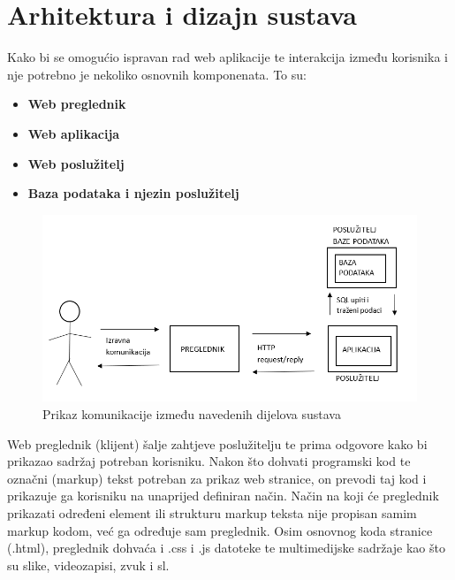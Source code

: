 \chapter{Arhitektura i dizajn sustava}

Kako bi se omogućio ispravan rad web aplikacije te interakcija između korisnika i nje potrebno je nekoliko osnovnih komponenata. To su:

	\begin{itemize}
		\item \textbf{Web preglednik}
		\item \textbf{Web aplikacija}
		\item \textbf{Web poslužitelj}
		\item \textbf{Baza podataka i njezin poslužitelj}		
	\end{itemize}

	\begin{figure}[H]
		\includegraphics[scale=0.4]{slike/komunikacijaKomponenata.PNG}
		\centering
		\caption{Prikaz komunikacije između navedenih dijelova sustava}
		\label{fig:skicaKomunijacije}
	\end{figure}

	
	Web preglednik (klijent) šalje zahtjeve poslužitelju te prima odgovore kako bi prikazao sadržaj potreban korisniku. Nakon što dohvati programski kod te označni (markup) tekst potreban za prikaz web stranice, on prevodi taj kod i prikazuje ga korisniku na unaprijed definiran način. Način na koji će preglednik prikazati određeni element ili strukturu markup teksta nije propisan samim markup kodom, već ga određuje sam preglednik. Osim osnovnog koda stranice (.html), preglednik dohvaća i .css i .js datoteke te multimedijske sadržaje kao što su slike, videozapisi, zvuk i sl. \vspace{\baselineskip}
	
